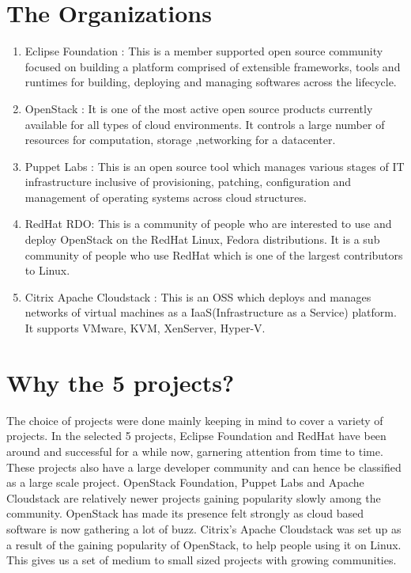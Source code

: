 \documentclass[seploa]{beavtex}
\begin{document}
\section{The Organizations}
\begin{enumerate}
\item Eclipse Foundation :
This is a member supported open source community focused on building a platform comprised of extensible frameworks, tools and runtimes for building, deploying and managing softwares across the lifecycle\cite{eclipse}.
\item OpenStack :
It is one of the most active open source products currently available for all types of cloud environments. It controls a large number of resources for computation, storage ,networking for a datacenter\cite{openstack}.
\item Puppet Labs :
This is an open source tool which manages various stages of IT infrastructure inclusive of provisioning, patching, configuration and management of operating systems across cloud structures\cite{puppet}.
\item RedHat RDO:
This is a community of people who are interested to use and deploy OpenStack on the RedHat Linux, Fedora distributions. It is a sub community of people who use RedHat which is one of the largest contributors to Linux\cite{rdo}.
\item Citrix Apache Cloudstack :
This is an OSS which deploys and manages networks of virtual machines as a IaaS(Infrastructure as a Service) platform. It supports VMware, KVM, XenServer, Hyper-V\cite{apache}.
\end{enumerate}

\section{Why the 5 projects?}
The choice of projects were done mainly keeping in mind to cover a variety of projects. In the selected 5 projects, Eclipse Foundation and RedHat have been around and successful for a while now, garnering attention from time to time. These projects also have a large developer community and can hence be classified as a large scale project. OpenStack Foundation, Puppet Labs and Apache Cloudstack are relatively newer projects gaining popularity slowly among the community. OpenStack has made its presence felt strongly as cloud based software is now gathering a lot of buzz. Citrix's Apache Cloudstack was set up as a result of the gaining popularity of OpenStack, to help people using it on Linux. This gives us a set of medium to small sized projects with growing communities.
\end{document}
